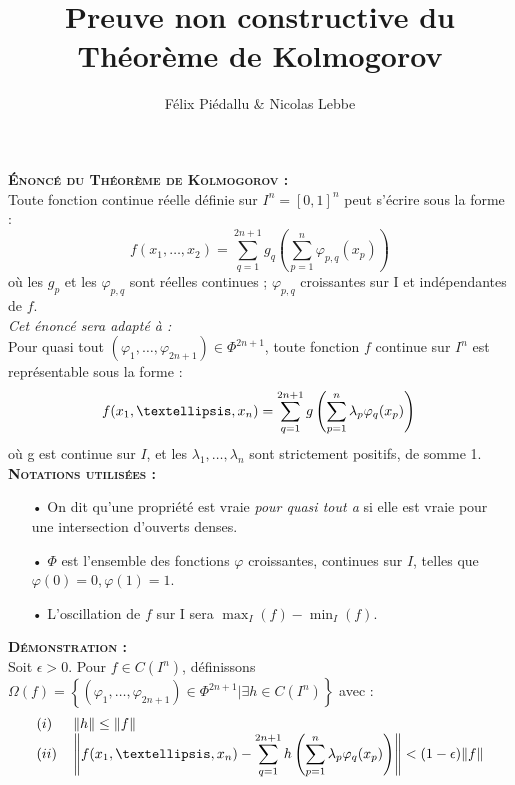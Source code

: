 \documentclass[a4paper]{article}
\author{Félix Piédallu \& Nicolas Lebbe}
\date{}
\title{Preuve non constructive du Théorème de Kolmogorov}
\begin{document}
\maketitle

\textbf{\textsc{Énoncé du Théorème de Kolmogorov :}}\\

Toute fonction continue réelle définie sur $I^n = [0,1]^n$ peut s'écrire sous la forme :\\
\[f(x_1, …, x_2) = \sum_{q=1}^{2n+1} g_q \left(\sum_{p=1}^n \varphi_{p,q}(x_p)\right)\]
où les $g_p$ et les $\varphi_{p,q}$ sont réelles continues ; $\varphi_{p,q}$ croissantes sur I et indépendantes de $f$.\\

\emph{Cet énoncé sera adapté à :}\\

Pour quasi tout $(\varphi_1,…, \varphi_{2n+1}) \in \Phi^{2n+1}$, toute fonction $f$ continue sur $I^n$ est représentable sous la forme :
\begin{equation}
f(x_1,…, x_n) = \sum_{q=1}^{2n+1} g \left(\sum_{p=1}^n \lambda_p \varphi_q(x_p) \right) \\
\end{equation}
où g est continue sur $I$, et les $\lambda_1,…, \lambda_n$ sont strictement positifs, de somme 1.\\

\textbf{\textsc{Notations utilisées :}}\\

\begin{itemize}
\item[•] On dit qu'une propriété est vraie \emph{pour quasi tout a} si elle est vraie pour une intersection d'ouverts denses.
\item[•] $\Phi$ est l'ensemble des fonctions $\varphi$ croissantes, continues sur $I$, telles que $\varphi(0)=0 , \varphi(1)=1$.
\item[•] L'oscillation de $f$ sur I sera $\displaystyle \max_I(f) - \min_I(f) $.\\
\end{itemize}

\textbf{\textsc{Démonstration :}}\\

Soit $\epsilon>0$. Pour $f \in C(I^n)$, définissons \\ 
$\Omega(f)=\left\lbrace (\varphi_1,…, \varphi_{2n+1}) \in \Phi^{2n+1} | \exists h \in C(I^n)\right\rbrace$ avec :\\
\begin{equation}
\begin{array}{l}
(i)\hspace{1.5em} \|h\| \leq \|f\|\; \\
(ii)\hspace{1em}\displaystyle \left\| f(x_1,…, x_n) - \sum_{q=1}^{2n+1} h \left(\sum_{p=1}^n \lambda_p \varphi_q (x_p) \right) \right\| < (1-\epsilon)\|f\|
\end{array}
\end{equation}
\end{document}
